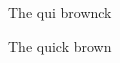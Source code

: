 \documentclass{article}
\begin{document}
The qui \hspace{+9.5px}brown\hspace{-39.5px}ck

The quick brown
\end{document}
